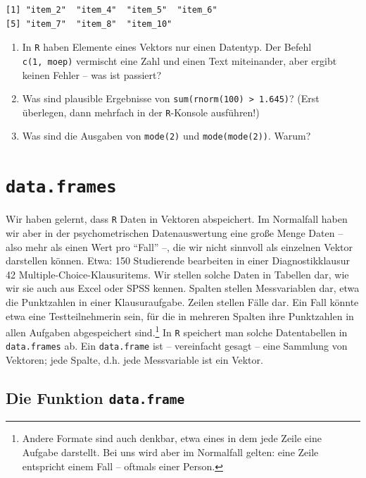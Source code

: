 \documentclass[12pt,]{tufte-book}
\providecommand{\tightlist}{%
  \setlength{\itemsep}{0pt}\setlength{\parskip}{0pt}}
\theoremstyle{definition}
\theoremstyle{definition}
\theoremstyle{definition}
\theoremstyle{remark}
\begin{document}
\begin{verbatim}
[1] "item_2"  "item_4"  "item_5"  "item_6" 
[5] "item_7"  "item_8"  "item_10"
\end{verbatim}

\begin{enumerate}
\def\labelenumi{\arabic{enumi}.}
\setcounter{enumi}{4}
\tightlist
\item
  In \texttt{R} haben Elemente eines Vektors nur einen Datentyp. Der
  Befehl\\
  \texttt{c(1,\ \textquotesingle{}moep\textquotesingle{})} vermischt
  eine Zahl und einen Text miteinander, aber ergibt keinen Fehler -- was
  ist passiert?
\item
  Was sind plausible Ergebnisse von
  \texttt{sum(rnorm(100)\ \textgreater{}\ 1.645)}? (Erst überlegen, dann
  mehrfach in der \texttt{R}-Konsole ausführen!)
\item
  Was sind die Ausgaben von \texttt{mode(2)} und \texttt{mode(mode(2))}.
  Warum?
\end{enumerate}

\hypertarget{dataframes}{\chapter{\texorpdfstring{\texttt{data.frames}}{data.frames}}\label{dataframes}}

Wir haben gelernt, dass \texttt{R} Daten in Vektoren abspeichert. Im
Normalfall haben wir aber in der psychometrischen Datenauswertung eine
große Menge Daten -- also mehr als einen Wert pro ``Fall'' --, die wir
nicht sinnvoll als einzelnen Vektor darstellen können. Etwa: 150
Studierende bearbeiten in einer Diagnostikklausur 42
Multiple-Choice-Klausuritems. Wir stellen solche Daten in Tabellen dar,
wie wir sie auch aus Excel oder SPSS kennen. Spalten stellen
Messvariablen dar, etwa die Punktzahlen in einer Klausuraufgabe. Zeilen
stellen Fälle dar. Ein Fall könnte etwa eine Testteilnehmerin sein, für
die in mehreren Spalten ihre Punktzahlen in allen Aufgaben abgespeichert
sind.\footnote{Andere Formate sind auch denkbar, etwa eines in dem jede
  Zeile eine Aufgabe darstellt. Bei uns wird aber im Normalfall gelten:
  eine Zeile entspricht einem Fall -- oftmals einer Person.} In
\texttt{R} speichert man solche Datentabellen in \texttt{data.frames}
ab. Ein \texttt{data.frame} ist -- vereinfacht gesagt -- eine Sammlung
von Vektoren; jede Spalte, d.h. jede Messvariable ist ein Vektor.

\section{\texorpdfstring{Die Funktion
\texttt{data.frame}}{Die Funktion data.frame}}\label{die-funktion-data.frame}
\end{document}
